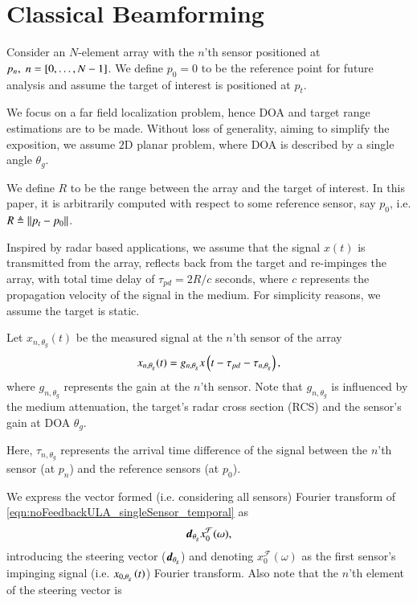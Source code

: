 \section{Classical Beamforming }\label{sec:setup}
Consider an $N$-element array with the $n$'th sensor positioned at $p_n,\; n=\left[{0,\ldots,N-1}\right]$. We define $p_{0}=0$ to be the reference point for future analysis and assume the target of interest is positioned at $p_t$.
\par We focus on a far field localization problem, hence DOA and target range estimations are to be made. Without loss of generality, aiming to simplify the exposition, we assume $2\text{D}$ planar problem, where DOA is described by a single angle $\theta_g$. 
\par We define $R$ to be the range between the array and the target of interest. In this paper, it is arbitrarily computed with respect to some reference sensor, say $p_{0}$, i.e. $R\triangleq\left\Vert p_{t}-p_{0}\right\Vert$.
\par Inspired by radar based applications, we assume that the signal $x(t)$ is transmitted from the array, reflects back from the target and re-impinges the array, with total time delay of $\tau_{pd}=2R/c$ seconds, where $c$ represents the propagation velocity of the signal in the medium. For simplicity reasons, we assume the target is static.
\par Let $x_{n,\theta_g}(t)$ be the measured signal at the $n$'th sensor of the array
\begin{equation}
x_{n,\theta_g}(t) = g_{n,\theta_{g}}x\Brack{t-\tau_{pd}-\tau_{n,\theta_{g}}},
\label{eqn:noFeedbackULA_singleSensor_temporal}
\end{equation}
where $g_{n,\theta_{g}}$ represents the gain at the $n$'th sensor. Note that $g_{n,\theta_{g}}$ is influenced by the medium attenuation, the target's radar cross section (RCS) and the sensor's gain at DOA $\theta_g$. 
\par Here, $\tau_{n,\theta_{g}}$ represents the arrival time difference of the signal between the $n$'th sensor (at $p_n$) and the reference sensors (at $p_{0}$). 
\par We express the vector formed (i.e. considering all sensors) Fourier transform of \eqref{eqn:noFeedbackULA_singleSensor_temporal} as  
\[
\boldsymbol{d}_{\theta_g}x^\mathcal{F}_0(\omega),
\]
introducing the steering vector ($\boldsymbol{d}_{\theta_g}$) and denoting $x^\mathcal{F}_0(\omega)$ as the first sensor's impinging signal (i.e. $x_{0,\theta_g}\left({t}\right)$) Fourier transform. Also note that the $n$'th element of the steering vector is
